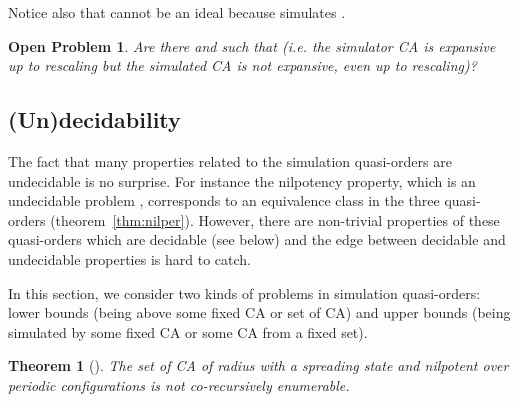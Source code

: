 \documentclass[a4paper]{elsarticle}
\newtheorem{thm}{Theorem}[section]
\newtheorem{openpb}{Open Problem}
\begin{document}
Notice also that  cannot be an ideal because
 simulates .

\begin{openpb}
  \label{open:expansif}
  Are there  and  such that
   (\textit{i.e.} the simulator CA is expansive up
  to rescaling but the simulated CA is not expansive, even up to
  rescaling)?
\end{openpb}


\subsection{(Un)decidability}
\label{sec:undec}

The fact that many properties related to the simulation quasi-orders are
undecidable is no surprise. For instance the nilpotency property, which is an
undecidable problem \cite{kari92}, corresponds to an equivalence class in the
three quasi-orders (theorem~\ref{thm:nilper}). However, there are non-trivial
properties of these quasi-orders which are decidable (see below) and the edge
between decidable and undecidable properties is hard to catch.

In this section, we consider two kinds of problems in simulation
quasi-orders: lower bounds (being above some fixed CA or set of CA)
and upper bounds (being simulated by some fixed CA or some CA from a
fixed set).

\begin{thm}[\cite{mazrap}]
  The set of CA of radius  with a spreading state and nilpotent
  over periodic configurations is not co-recursively enumerable.
\end{thm}
\end{document}
